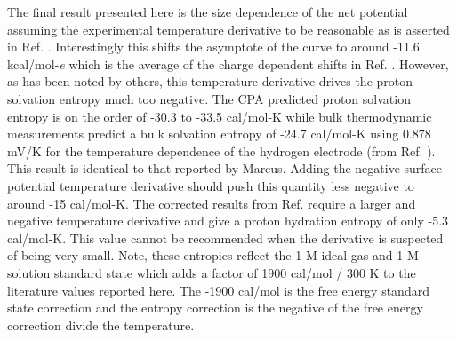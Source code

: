 \begin{cpa}
  The final result presented here is the size dependence of the net potential assuming the experimental temperature derivative to be reasonable\cite{randles1977structure} 
  as is asserted in Ref. \cite{hunenberger2011sp}. Interestingly this shifts the asymptote of the curve to around -11.6 kcal/mol-\emph{e} which is the average of the charge 
  dependent shifts in Ref. \cite{ashbaugh2008lps}. However, as has been noted by others\cite{donald2010expand_cpa,pollard2014cpa1}, this temperature derivative drives the
  proton solvation entropy much too negative. The CPA predicted proton solvation entropy is on the order of -30.3 to -33.5 cal/mol-K\cite{coe1998cpa1,donald2010expand_cpa}
  while bulk thermodynamic measurements predict a bulk solvation entropy of -24.7 cal/mol-K\cite{conway1978evaluation} using 0.878 mV/K for the temperature dependence of 
  the hydrogen electrode (from Ref. \cite{conway1993non}). This result is identical to that reported by Marcus\cite{marcus1985book}. Adding the negative surface potential 
  temperature derivative should push this quantity less negative to around -15 cal/mol-K. The corrected results from Ref. \cite{vlcek2013cpa} require a larger and negative
  temperature derivative and give a proton hydration entropy of only -5.3 cal/mol-K. This value cannot be recommended when the derivative is suspected of being very small.
  Note, these entropies reflect the 1 M ideal gas and 1 M solution standard state which adds a factor of 1900 cal/mol / 300 K to the literature values reported here. The 
  -1900 cal/mol is the free energy standard state correction and the entropy correction is the negative of the free energy correction divide the temperature.


\end{cpa}
